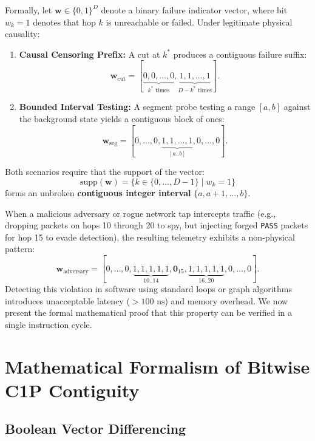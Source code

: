 \documentclass[11pt,a4paper]{article}
\theoremstyle{definition}
\begin{document}
Formally, let $\mathbf{w} \in \{0, 1\}^D$ denote a binary failure indicator vector, where bit $w_k = 1$ denotes that hop $k$ is unreachable or failed. Under legitimate physical causality:
\begin{enumerate}
    \item \textbf{Causal Censoring Prefix:} A cut at $k^*$ produces a contiguous failure suffix:
    \begin{equation}
        \mathbf{w}_{\text{cut}} = [\underbrace{0, 0, \dots, 0}_{k^* \text{ times}}, \underbrace{1, 1, \dots, 1}_{D - k^* \text{ times}}].
    \end{equation}
    \item \textbf{Bounded Interval Testing:} A segment probe testing a range $[a, b]$ against the background state yields a contiguous block of ones:
    \begin{equation}
        \mathbf{w}_{\text{seg}} = [0, \dots, 0, \underbrace{1, 1, \dots, 1}_{[a..b]}, 0, \dots, 0].
    \end{equation}
\end{enumerate}

Both scenarios require that the support of the vector:
\begin{equation}
    \text{supp}(\mathbf{w}) = \{k \in \{0, \dots, D-1\} \mid w_k = 1\}
\end{equation}
forms an unbroken \textbf{contiguous integer interval} $\{a, a+1, \dots, b\}$. 

When a malicious adversary or rogue network tap intercepts traffic (e.g., dropping packets on hops 10 through 20 to spy, but injecting forged \texttt{PASS} packets for hop 15 to evade detection), the resulting telemetry exhibits a non-physical pattern:
\begin{equation}
    \mathbf{w}_{\text{adversary}} = [0, \dots, 0, \underbrace{1, 1, 1, 1, 1}_{10..14}, \mathbf{0}_{15}, \underbrace{1, 1, 1, 1, 1}_{16..20}, 0, \dots, 0].
\end{equation}
Detecting this violation in software using standard loops or graph algorithms introduces unacceptable latency ($> 100\text{ ns}$) and memory overhead. We now present the formal mathematical proof that this property can be verified in a single instruction cycle.

\section{Mathematical Formalism of Bitwise C1P Contiguity}

\subsection{Boolean Vector Differencing}
\end{document}
